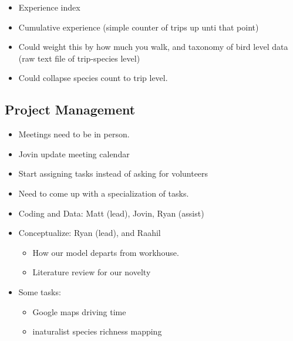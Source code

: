 \documentclass[
  letterpaper,
]{article}
\providecommand{\tightlist}{%
  \setlength{\itemsep}{0pt}\setlength{\parskip}{0pt}}\usepackage{longtable,booktabs,array}
\begin{document}
\begin{tcolorbox}
\begin{itemize}
\begin{itemize}
    \begin{itemize}
    \tightlist
    \item
      Experience index
    \item
      Cumulative experience (simple counter of trips up unti that point)
    \item
      Could weight this by how much you walk, and taxonomy of bird level
      data (raw text file of trip-species level)
    \item
      Could collapse species count to trip level.
    \end{itemize}
  \end{itemize}
\end{itemize}

\subsection{Project Management}\label{project-management}

\begin{itemize}
\tightlist
\item
  Meetings need to be in person.
\item
  Jovin update meeting calendar
\item
  Start assigning tasks instead of asking for volunteers
\item
  Need to come up with a specialization of tasks.
\item
  Coding and Data: Matt (lead), Jovin, Ryan (assist)
\item
  Conceptualize: Ryan (lead), and Raahil

  \begin{itemize}
  \tightlist
  \item
    How our model departs from workhouse.
  \item
    Literature review for our novelty
  \end{itemize}
\item
  Some tasks:

  \begin{itemize}
  \tightlist
  \item
    Google maps driving time
  \item
    inaturalist species richness mapping
  \end{itemize}
\end{itemize}

\end{tcolorbox}
\end{document}
